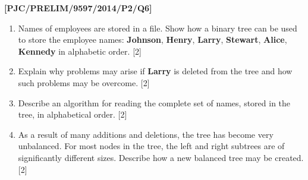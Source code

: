 \item \textbf{{[}PJC/PRELIM/9597/2014/P2/Q6{]} }
\begin{enumerate}
\item Names of employees are stored in a file. Show how a binary tree can
be used to store the employee names: \textbf{Johnson}, \textbf{Henry},
\textbf{Larry}, \textbf{Stewart}, \textbf{Alice}, \textbf{Kennedy}
in alphabetic order.\hfill{} {[}2{]}
\item Explain why problems may arise if \textbf{Larry} is deleted from the
tree and how such problems may be overcome. \hfill{}{[}2{]}
\item Describe an algorithm for reading the complete set of names, stored
in the tree, in alphabetical order.\hfill{} {[}2{]}
\item As a result of many additions and deletions, the tree has become very
unbalanced. For most nodes in the tree, the left and right subtrees
are of significantly different sizes. Describe how a new balanced
tree may be created. \hfill{}{[}2{]}
\end{enumerate}